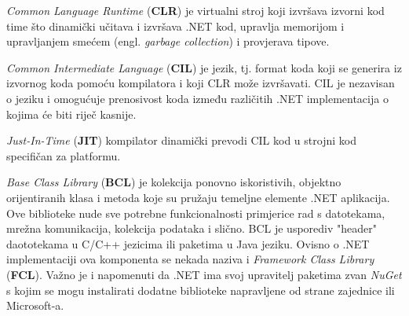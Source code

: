 \documentclass{foi}
\begin{document}
\begin{flushleft}
\textit{Common Language Runtime} (\textbf{CLR}) je virtualni stroj koji izvršava izvorni kod time što dinamički učitava i izvršava .NET kod, upravlja memorijom i upravljanjem smećem (engl. \textit{garbage collection}) i provjerava tipove.\cite{GeeksNET}
\end{flushleft}

\begin{flushleft}
\textit{Common Intermediate Language} (\textbf{CIL}) je jezik, tj. format koda koji se generira iz izvornog koda pomoću kompilatora i koji CLR može izvršavati. CIL je nezavisan o jeziku i omogućuje prenosivost koda između različitih .NET implementacija o kojima će biti riječ kasnije.
\end{flushleft}

\begin{flushleft}
\textit{Just-In-Time} (\textbf{JIT}) kompilator dinamički prevodi CIL kod u strojni kod specifičan za platformu.\cite{NETjit}
\end{flushleft}

\begin{flushleft}
\textit{Base Class Library} (\textbf{BCL}) je kolekcija ponovno iskoristivih, objektno orijentiranih klasa i metoda koje su pružaju temeljne elemente .NET aplikacija. Ove biblioteke nude sve potrebne funkcionalnosti primjerice rad s datotekama, mrežna komunikacija, kolekcija podataka i slično. BCL je usporediv "header" daototekama u C/C++ jezicima ili paketima u Java jeziku. Ovisno o .NET implementaciji ova komponenta se nekada naziva i \textit{Framework Class Library} (\textbf{FCL})\cite{GeeksNET}. Važno je i napomenuti da .NET ima svoj upravitelj paketima zvan \textit{NuGet} s kojim se mogu instalirati dodatne biblioteke napravljene od strane zajednice ili Microsoft-a.
\end{flushleft}
\end{document}

